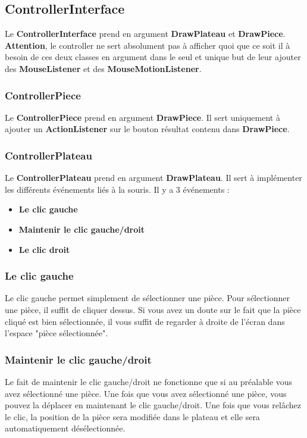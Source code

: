 \documentclass[a4paper,12pt]{article} %
\begin{document}
\subsection{ControllerInterface}
Le \textbf{ControllerInterface} prend en argument \textbf{DrawPlateau} et \textbf{DrawPiece}. \textbf{Attention}, le controller ne sert absolument pas à afficher quoi que ce soit il à besoin de ces deux classes en argument dans le seul et unique but de leur ajouter des \textbf{MouseListener} et des \textbf{MouseMotionListener}.

\subsubsection{ControllerPiece}
Le \textbf{ControllerPiece} prend en argument \textbf{DrawPiece}. Il sert uniquement à ajouter un \textbf{ActionListener} sur le bouton résultat contenu dans \textbf{DrawPiece}.

\subsubsection{ControllerPlateau}
Le \textbf{ControllerPlateau} prend en argument \textbf{DrawPlateau}. Il sert à implémenter les différents événements liés à la souris. Il y a 3 événements :

\begin{itemize}
    \item \textbf{Le clic gauche}
    \item  \textbf{Maintenir le clic gauche/droit}
    \item  \textbf{Le clic droit}
\end{itemize}

\subsubsection{Le clic gauche}
Le clic gauche permet simplement de sélectionner une pièce. Pour sélectionner une pièce, il suffit de cliquer dessus. Si vous avez un doute sur le fait que la pièce cliqué est bien sélectionnée, il vous suffit de regarder à droite de l'écran dans l'espace "pièce sélectionnée".

\subsubsection{Maintenir le clic gauche/droit}
Le fait de maintenir le clic gauche/droit ne fonctionne que si au préalable vous avez sélectionné une pièce. Une fois que vous avez sélectionné une pièce, vous pouvez la déplacer en maintenant le clic gauche/droit. Une fois que vous relâchez le clic, la position de la pièce sera modifiée dans le plateau et elle sera automatiquement désélectionnée.
\end{document}
